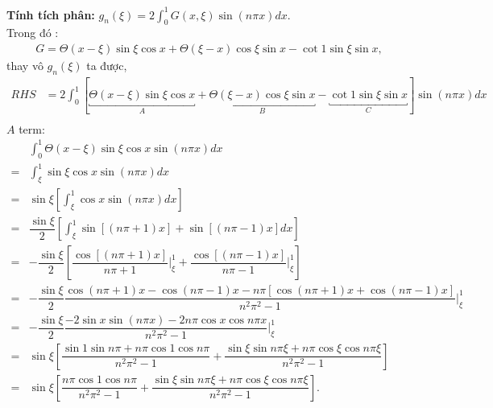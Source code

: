 \documentclass{article}
\newcommand{\dps}{\displaystyle}
\newcommand{\f}[2]{\dfrac{#1}{#2}}
\newcommand{\at}[2]{\bigg\rvert_{#1}^{#2} }
\begin{document}
\textbf{Tính tích phân:} $g_n (\xi) = 2 \dps\int_{0}^{1} G(x,\xi) \sin (n\pi x) dx$. \\
Trong đó :
\begin{align*}
	G = \Theta (x-\xi) \sin \xi \cos x + \Theta (\xi - x) \cos \xi \sin x - \cot 1 \sin \xi \sin x,
\end{align*}
thay vô $g_n (\xi)$ ta được,
\begin{align*}
	RHS & = 2 \int_{0}^{1} \left[\underbracket{\Theta (x-\xi) \sin \xi \cos x}_A + \underbracket{\Theta (\xi - x) \cos \xi \sin x}_B - \underbracket{\cot 1 \sin \xi \sin x}_C \right] \sin (n\pi x) dx \\
\end{align*}
$A$ term:
\begin{align*}
	  & \int_{0}^{1} \Theta (x-\xi) \sin \xi \cos x \sin (n\pi x) dx                                                                                                \\
	= & \int_{\xi}^{1} \sin \xi \cos x \sin (n\pi x) dx                                                                                                             \\
	= & \sin \xi \left[\int_{\xi}^{1} \cos x \sin (n\pi x) dx\right]                                                                                                \\
	= & \f{\sin \xi}{2} \left[\int_{\xi}^{1} \sin [(n\pi+1)x] + \sin [(n\pi-1)x] dx\right]                                                                          \\
	= & -\f{\sin \xi}{2} \left[ \f{\cos [(n\pi+1)x]}{n\pi+1} \at{\xi}{1} + \f{\cos [(n\pi-1)x]}{n\pi-1} \at{\xi}{1}\right]                                          \\
	= & -\f{\sin \xi}{2} \f{\cos(n\pi+1)x - \cos(n\pi-1)x - n\pi[\cos(n\pi + 1)x + \cos(n\pi - 1)x]}{n^2\pi^2 - 1} \at{\xi}{1}                                      \\
	= & -\f{\sin \xi}{2} \f{-2 \sin x \sin (n\pi x) - 2 n \pi \cos x \cos n\pi x}{n^2\pi^2 - 1} \at{\xi}{1}                                                         \\
	= & \sin \xi \left[ \f{\sin 1 \sin n\pi + n \pi \cos 1 \cos n\pi}{n^2\pi^2 - 1} + \f{\sin \xi \sin n\pi\xi + n \pi \cos \xi \cos n\pi\xi}{n^2\pi^2 - 1} \right] \\
	= & \sin \xi \left[ \f{ n \pi \cos 1 \cos n\pi}{n^2\pi^2 - 1} + \f{\sin \xi \sin n\pi\xi + n \pi \cos \xi \cos n\pi\xi}{n^2\pi^2 - 1} \right].                  \\
\end{align*}
\end{document}
